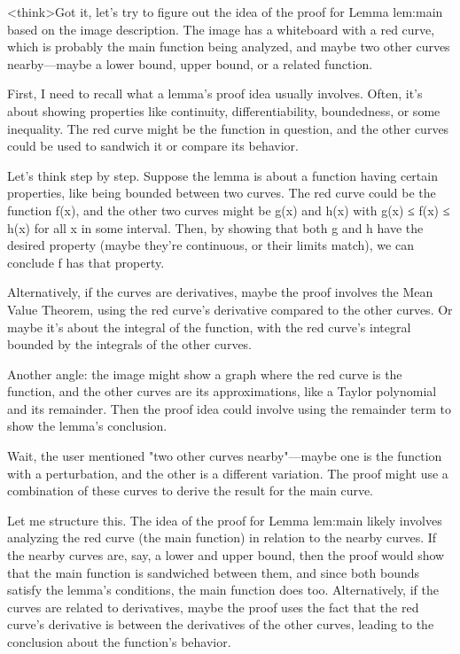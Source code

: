 <think>Got it, let's try to figure out the idea of the proof for Lemma lem:main based on the image description. The image has a whiteboard with a red curve, which is probably the main function being analyzed, and maybe two other curves nearby—maybe a lower bound, upper bound, or a related function. 

First, I need to recall what a lemma's proof idea usually involves. Often, it's about showing properties like continuity, differentiability, boundedness, or some inequality. The red curve might be the function in question, and the other curves could be used to sandwich it or compare its behavior. 

Let's think step by step. Suppose the lemma is about a function having certain properties, like being bounded between two curves. The red curve could be the function f(x), and the other two curves might be g(x) and h(x) with g(x) ≤ f(x) ≤ h(x) for all x in some interval. Then, by showing that both g and h have the desired property (maybe they're continuous, or their limits match), we can conclude f has that property. 

Alternatively, if the curves are derivatives, maybe the proof involves the Mean Value Theorem, using the red curve's derivative compared to the other curves. Or maybe it's about the integral of the function, with the red curve's integral bounded by the integrals of the other curves. 

Another angle: the image might show a graph where the red curve is the function, and the other curves are its approximations, like a Taylor polynomial and its remainder. Then the proof idea could involve using the remainder term to show the lemma's conclusion. 

Wait, the user mentioned "two other curves nearby"—maybe one is the function with a perturbation, and the other is a different variation. The proof might use a combination of these curves to derive the result for the main curve. 

Let me structure this. The idea of the proof for Lemma lem:main likely involves analyzing the red curve (the main function) in relation to the nearby curves. If the nearby curves are, say, a lower and upper bound, then the proof would show that the main function is sandwiched between them, and since both bounds satisfy the lemma's conditions, the main function does too. Alternatively, if the curves are related to derivatives, maybe the proof uses the fact that the red curve's derivative is between the derivatives of the other curves, leading to the conclusion about the function's behavior. 

